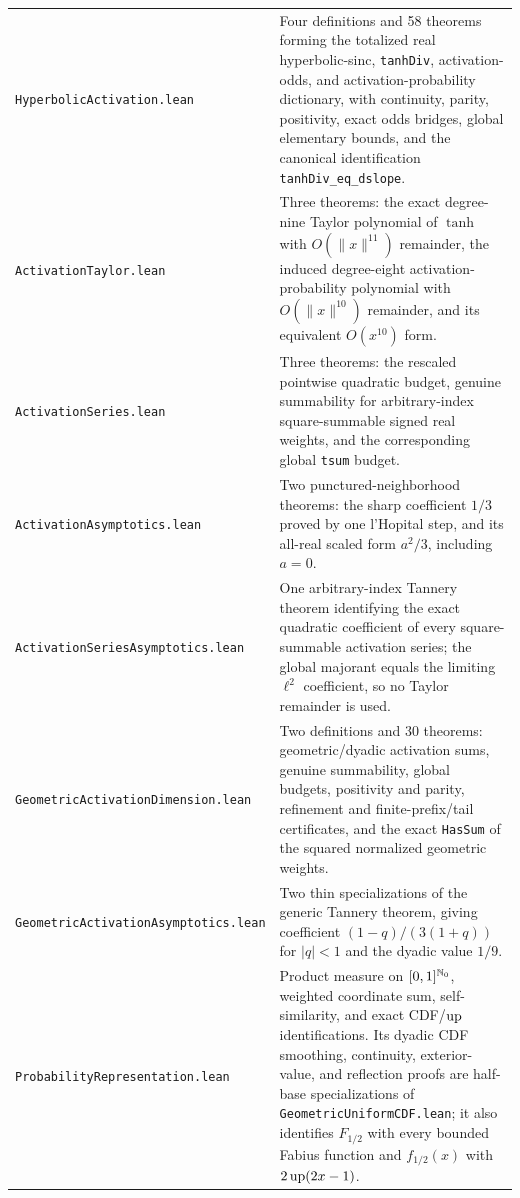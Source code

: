 \documentclass[11pt,oneside]{article}
\theoremstyle{definition}
\theoremstyle{remark}
\begin{document}
\begin{longtable}{>{\raggedright\arraybackslash}p{} >{\raggedright\arraybackslash}p{}}
\nolinkurl{HyperbolicActivation.lean} & Four definitions and 58 theorems forming the totalized real hyperbolic-sinc, \nolinkurl{tanhDiv}, activation-odds, and activation-probability dictionary, with continuity, parity, positivity, exact odds bridges, global elementary bounds, and the canonical identification \nolinkurl{tanhDiv_eq_dslope}. \\
\nolinkurl{ActivationTaylor.lean} & Three theorems: the exact degree-nine Taylor polynomial of \(\tanh\) with \(O(\lVert x\rVert^{11})\) remainder, the induced degree-eight activation-probability polynomial with \(O(\lVert x\rVert^{10})\) remainder, and its equivalent \(O(x^{10})\) form. \\
\nolinkurl{ActivationSeries.lean} & Three theorems: the rescaled pointwise quadratic budget, genuine summability for arbitrary-index square-summable signed real weights, and the corresponding global \nolinkurl{tsum} budget. \\
\nolinkurl{ActivationAsymptotics.lean} & Two punctured-neighborhood theorems: the sharp coefficient \(1/3\) proved by one l'Hopital step, and its all-real scaled form \(a^2/3\), including \(a=0\). \\
\nolinkurl{ActivationSeriesAsymptotics.lean} & One arbitrary-index Tannery theorem identifying the exact quadratic coefficient of every square-summable activation series; the global majorant equals the limiting \(\ell^2\) coefficient, so no Taylor remainder is used. \\
\nolinkurl{GeometricActivationDimension.lean} & Two definitions and 30 theorems: geometric/dyadic activation sums, genuine summability, global budgets, positivity and parity, refinement and finite-prefix/tail certificates, and the exact \nolinkurl{HasSum} of the squared normalized geometric weights. \\
\nolinkurl{GeometricActivationAsymptotics.lean} & Two thin specializations of the generic Tannery theorem, giving coefficient \((1-q)/(3(1+q))\) for \(\lvert q\rvert<1\) and the dyadic value \(1/9\). \\
\nolinkurl{ProbabilityRepresentation.lean} & Product measure on \([0,1]^{\mathbb{N}_{0}}\), weighted coordinate sum, self-similarity, and exact CDF/\(\operatorname{up}\) identifications.  Its dyadic CDF smoothing, continuity, exterior-value, and reflection proofs are half-base specializations of \nolinkurl{GeometricUniformCDF.lean}; it also identifies \(F_{1/2}\) with every bounded Fabius function and \(f_{1/2}(x)\) with \(2\operatorname{up}(2x-1)\). \\

\end{longtable}
\end{document}
